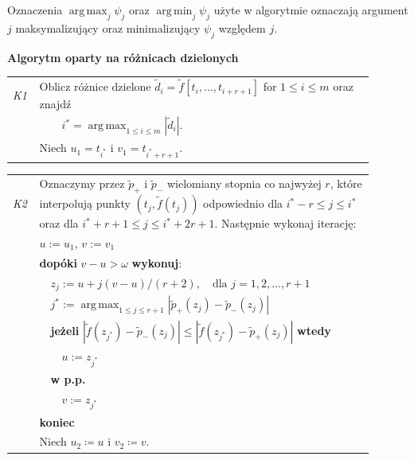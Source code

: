 \documentclass[oik, pdftex, man]{mgrwms}
\DeclareMathOperator*{\argmax}{arg\,max}
\DeclareMathOperator*{\argmin}{arg\,min}
\begin{document}
    Oznaczenia $\argmax_{j} \psi_{j}$ oraz $\argmin_{j} \psi_{j}$ użyte w algorytmie oznaczają argument $j$ maksymalizujący oraz minimalizujący $\psi_{j}$ względem $j$.

    \vspace{10pt}
    \begin{table}[H]
        \begin{center}
            \textbf{Algorytm oparty na różnicach dzielonych}            
        \end{center}

        \begin{tabular}{p{0.045\linewidth} p{0.85\linewidth}}        
            \textit{K1}     & Oblicz różnice dzielone $\tilde{d}_i = \tilde{f}[t_i, \ldots, t_{i+r+1}]$ for $1 \leq i \leq m $ oraz znajdź \\
                            & \(\displaystyle \qquad i^* = \argmax_{1 \leq i \leq m }|\tilde{d}_i| \).  \\
                            & Niech $u_1 = t_{i^*}$ i $v_1 = t_{i^* + r + 1}$. \\
        \end{tabular}
    \end{table} \vspace{-20pt}
    \begin{table}[H]
        \begin{tabular}{p{0.045\linewidth} p{0.85\linewidth}}
        \textit{K2} & Oznaczymy przez $\tilde{p}_+$ i $\tilde{p}_-$ wielomiany stopnia co najwyżej $r$, które interpolują punkty $(t_j, \tilde{f}(t_j))$ odpowiednio dla $i^* - r \leq j \leq i^*$ oraz dla $i^* + r + 1 \leq j \leq i^* + 2r + 1$. Następnie wykonaj iterację: \\
                        & $u := u_1$, $v := v_1$ \\
                        & \textbf{dopóki} $v-u > \omega$ \textbf{wykonuj}: \\
                        & $\quad$$z_j := u + j(v-u) / (r+2), \quad\text{dla } j = 1, 2, \ldots, r + 1$ \\
                        & $\quad$\(\displaystyle j^* := \argmax_{1 \leq j \leq r + 1}|\tilde{p}_{+}(z_j) - \tilde{p}_{-}(z_j)| \) \\
                        & $\quad$\textbf{jeżeli} $|\tilde{f}(z_{j^*}) - \tilde{p}_{-}(z_j)| \leq |\tilde{f}(z_{j^*}) - \tilde{p}_{+}(z_j)|$ \textbf{wtedy} \\
                        & $\quad\quad$$u:= z_{j^*}$ \\
                        & $\quad$\textbf{w p.p.} \\
                        & $\quad\quad$$v:= z_{j^*}$ \\
                        & \textbf{koniec} \\
                        & Niech $u_2 \coloneqq u$ i $v_2 \coloneqq v$. \\
        \end{tabular}
    \end{table} \vspace{-20pt}
\end{document}
